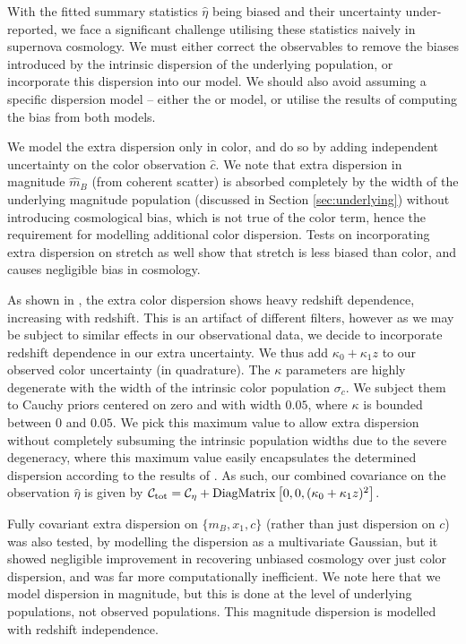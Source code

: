\documentclass[a4paper,fleqn,usenatbib]{emulateapj}
\newcommand{\gten}{\citetalias{Guy2010}}
\newcommand{\celeven}{\citetalias{Chotard2011}}
\begin{document}
With the fitted summary statistics $\hat{\eta}$ being biased and their uncertainty under-reported, we face a significant challenge utilising these statistics naively in supernova cosmology. We must either correct the observables to remove the biases introduced by the intrinsic dispersion of the underlying population, or incorporate this dispersion into our model. We should also avoid assuming a specific dispersion model -- either the {\gten} or {\celeven} model, or utilise the results of computing the bias from both models.

We model the extra dispersion only in color, and do so by adding independent uncertainty on the color observation $\hat{c}$. We note that extra dispersion in magnitude $\hat{m}_B$ (from coherent scatter) is absorbed completely by the width of the underlying magnitude population (discussed in Section \ref{sec:underlying}) without introducing cosmological bias, which is not true of the color term, hence the requirement for modelling additional color dispersion. Tests on incorporating extra dispersion on stretch as well show that stretch is less biased than color, and causes negligible bias in cosmology.

As shown in \citep{Kessler2013}, the extra color dispersion shows heavy redshift dependence, increasing with redshift. This is an artifact of different filters, however as we may be subject to similar effects in our observational data, we decide to incorporate redshift dependence in our extra uncertainty. We thus add $\kappa_0 + \kappa_1 z$ to our observed color uncertainty (in quadrature). The $\kappa$ parameters are highly degenerate with the width of the intrinsic color population $\sigma_c$. We subject them to Cauchy priors centered on zero and with width $0.05$, where $\kappa$ is bounded between $0$ and $0.05$. We pick this maximum value to allow extra dispersion without completely subsuming the intrinsic population widths due to the severe degeneracy, where this maximum value easily encapsulates the determined dispersion according to the results of \citet{Kessler2013}. As such, our combined covariance on the observation $\hat{\eta}$ is given by $\mathcal{C}_{\rm tot} = \mathcal{C_\eta} + {\rm DiagMatrix}\left[0, 0, (\kappa_0 + \kappa_1 z)^2\right]$. 

Fully covariant extra dispersion on $\lbrace m_B, x_1, c \rbrace$ (rather than just dispersion on $c$) was also tested, by modelling the dispersion as a multivariate Gaussian, but it showed negligible improvement in recovering unbiased cosmology over just color dispersion, and was far more computationally inefficient. We note here that we model dispersion in magnitude, but this is done at the level of underlying populations, not observed populations. This magnitude dispersion is modelled with redshift independence.
\end{document}
